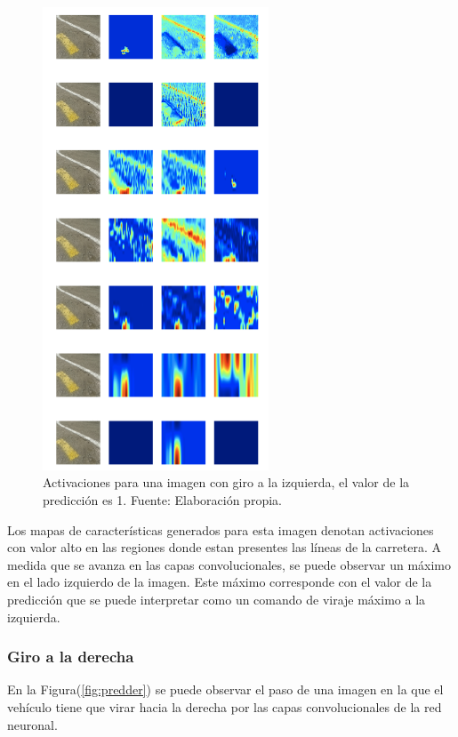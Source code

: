         \begin{figure}[!h] 
            \centering
            \includegraphics[width=0.60\textwidth]{img/predizq}
            \caption[Activaciones para una imagen con giro a la izquierda]{Activaciones para una imagen con giro a la izquierda, el valor de 
            la predicción es 1. Fuente: Elaboración propia. }
            \label{fig:predizq}
        \end{figure}

        Los mapas de características generados para esta imagen denotan activaciones con valor alto en las regiones donde estan 
        presentes las líneas de la carretera. A medida que se avanza en las capas convolucionales, se puede observar un máximo 
        en el lado izquierdo de la imagen. Este máximo corresponde con el valor de la predicción que se puede interpretar como un comando 
        de viraje máximo a la izquierda.
        

        \subsubsection{Giro a la derecha}
        En la Figura(\ref{fig:predder}) se puede observar el paso de una imagen en la que el vehículo tiene que virar hacia la derecha por 
        las capas convolucionales de la red neuronal. 

